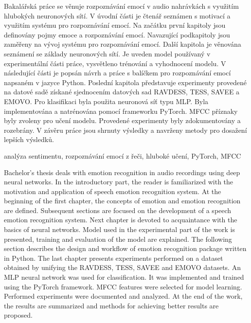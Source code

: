 \documentclass[FM,BP]{tulthesis}
\begin{document}

\begin{abstractCZ}  %
Bakalářská práce se věnuje rozpoznávání emocí v audio nahrávkách s využitím hlubokých neuronových sítí. V úvodní části je čtenář seznámen s motivací a využitím systému pro rozpoznávání emocí. Na začátku první kapitoly jsou definovány pojmy emoce a rozpoznávání emocí. Navazující podkapitoly jsou zaměřeny na vývoj systému pro rozpoznávání emocí. Další kapitola je věnována seznámení se základy neuronových sítí. Je uveden model používaný v experimentální části práce, vysvětleno trénování a vyhodnocení modelu. V následující části je popsán návrh a práce s balíčkem pro rozpoznávání emocí napsaném v jazyce Python. Poslední kapitola představuje experimenty provedené na datové sadě získané sjednocením datových sad RAVDESS, TESS, SAVEE a EMOVO. Pro klasifikaci byla použita neuronová síť typu MLP. Byla implementována a natrénována pomocí frameworku PyTorch. MFCC příznaky byly zvoleny pro učení modelu. Provedené experimenty byly zdokumentovány a rozebrány. V závěru práce jsou shrnuty výsledky a navrženy metody pro dosažení lepších výsledků.
\end{abstractCZ}

\begin{keywordsCZ}
analýza sentimentu, rozpoznávání emocí z řeči, hluboké učení, PyTorch, MFCC
\end{keywordsCZ}


\vspace{2cm}

\begin{abstractEN}
Bachelor's thesis deals with emotion recognition in audio recordings using deep neural networks. In the introductory part, the reader is familiarized with the motivation and application of speech emotion recognition system. At the beginning of the first chapter, the concepts of emotion and emotion recognition are defined. Subsequent sections are focused on the development of a speech emotion recognition system. Next chapter is devoted to acquaintance with the basics of neural networks. Model used in the experimental part of the work is presented, training and evaluation of the model are explained. The following section describes the design and workflow of emotion recognition package written in Python. The last chapter presents experiments performed on a dataset obtained by unifying the RAVDESS, TESS, SAVEE and EMOVO datasets. An MLP neural network was used for classification. It was implemented and trained using the PyTorch framework. MFCC features were selected for model learning. Performed experiments were documented and analyzed. At the end of the work, the results are summarized and methods for achieving better results are proposed.
\end{abstractEN}
\end{document}
